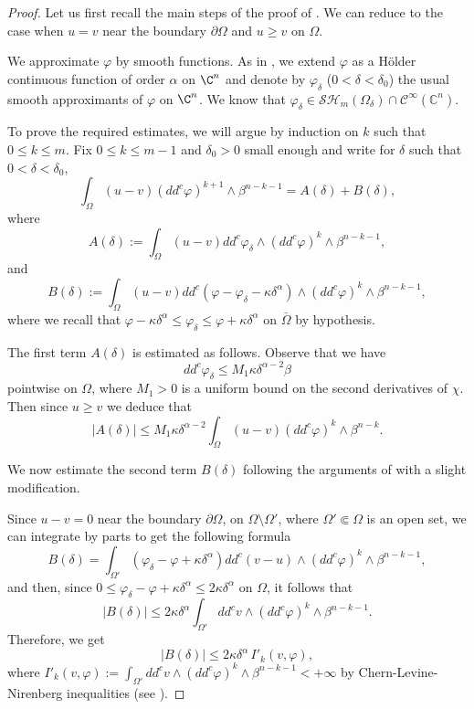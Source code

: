 \begin{proof}
Let us first recall the main steps of the proof of \cite[Lem.\,4.2]{BZ20}.
We can reduce to the case when $u = v$ near the boundary $\partial \Omega$ and $u \geq v$ on $\Omega$.

We approximate $\varphi$ by smooth functions. As in \cite{BZ20}, we extend $\varphi$ as a Hölder continuous function of order $\alpha$ on $\C^n$ and denote by $\varphi_{\delta}$ ($0 < \delta < \delta_0$) the usual smooth approximants of $\varphi $ on $\C^n$.
We know that $\varphi_\delta \in \mathcal{SH}_m (\Omega_{\delta})\cap\mathcal{C}^{\infty}(\mathbb C^n)$.

To prove the required estimates, we will argue by induction on $k$ such that \hbox{$0\!\leq\!k\!\leq\!m$}. Fix $0 \leq k \leq m-1$ and $\delta_0 > 0$ small enough and write for $\delta$ such that $0 < \delta < \delta_0$,
\[
\int_{\Omega}(u-v) (dd^c\varphi)^{k+1} \wedge\beta^{n-k-1} = A (\delta) + B (\delta),
\]
where
\[
A (\delta):=\int_{\Omega}(u-v)dd^c \varphi_{\delta}\wedge(dd^c\varphi)^k\wedge\beta^{n-k-1},
\]
and
\[
B (\delta) := \int_{\Omega}(u-v) dd^c(\varphi - \varphi_{\delta} - \kappa \delta^\alpha)\wedge(dd^c\varphi)^k\wedge\beta^{n-k-1},
\]
where we recall that $ \varphi - \kappa \delta^\alpha \leq \varphi_\delta \leq \varphi + \kappa \delta^\alpha$ on $\bar{\Omega}$ by hypothesis.

The first term $A (\delta)$ is estimated as follows. Observe that we have
\[
dd^c \varphi_\delta \leq M_1 \kappa \delta^{\alpha -2} \beta
\]
pointwise on $\Omega$, where $M_1 > 0$ is a uniform bound on the second derivatives of $\chi$. Then since $u \geq v$ we deduce that
\begin{equation} \label{eq:estimationA}
\vert A (\delta) \vert \leq M_1 \kappa \delta^{\alpha -2} \int_{\Omega} (u-v) (dd^c \varphi)^k \wedge \beta^{n-k}.
\end{equation}

We now estimate the second term $B (\delta)$ following the arguments of \cite[Lem.\,4.2]{BZ20} with a slight modification.

Since $ u - v = 0$ near the boundary $\partial \Omega$, \ie on $\Omega \setminus \Omega'$, where $\Omega' \Subset \Omega$ is an open set, we can integrate by parts to get the following formula
\[
B (\delta) = \int_{\Omega'} (\varphi_{\delta} - \varphi + \kappa \delta^\alpha) dd^c (v-u) \wedge(dd^c\varphi)^k\wedge\beta^{n-k-1},
\]
and then, since $0 \leq \varphi_{\delta}-\varphi + \kappa \delta^\alpha \leq 2 \kappa \delta^{\alpha}$ on $\Omega$, it follows that
\[
\vert B (\delta)\vert \leq 2 \kappa \delta^{\alpha} \int_{\Omega'} dd^c v \wedge(dd^c\varphi)^k\wedge\beta^{n-k-1}.
\]
Therefore, we get
\begin{equation} \label{eq:estimationB}
|B (\delta)| \leq 2 \kappa \delta^{\alpha} \, I'_k(v,\varphi),
\end{equation}
where $I'_k (v,\varphi) := \int_{\Omega'} dd^c v \wedge(dd^c\varphi)^k\wedge\beta^{n-k-1} < + \infty$ by Chern-Levine-Nirenberg inequalities (see \cite{Lu12}).


\end{proof}
